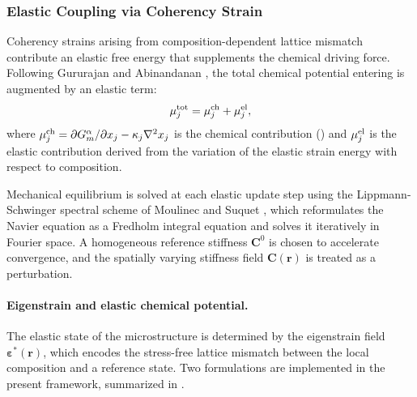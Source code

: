 \subsubsection{Elastic Coupling via Coherency Strain}
\label{sec:elastic_coupling_pf}

{\color{blue}
Coherency strains arising from composition-dependent lattice mismatch
contribute an elastic free energy that supplements the chemical driving
force.  Following Gururajan and Abinandanan \cite{gururajan2007phase},
the total chemical potential entering  is
augmented by an elastic term:
%
\begin{equation}\label{eq:mu_tot_elastic}
    \mu_j^{\rm tot} = \mu_j^{\rm ch} + \mu_j^{\rm el},
\end{equation}
%
where $\mu_j^{\rm ch} = \partial G^\alpha_m/\partial x_j - \kappa_j\nabla^2 x_j$
is the chemical contribution () and $\mu_j^{\rm el}$
is the elastic contribution derived from the variation of the elastic
strain energy with respect to composition.

Mechanical equilibrium is solved at each elastic update step using the
Lippmann-Schwinger spectral scheme of Moulinec and
Suquet \cite{moulinec1998numerical}, which reformulates the Navier
equation as a Fredholm integral equation and solves it iteratively in
Fourier space.  A homogeneous reference stiffness $\mathbf{C}^0$ is
chosen to accelerate convergence, and the spatially varying stiffness
field $\mathbf{C}(\boldsymbol{r})$ is treated as a perturbation.

\paragraph{Eigenstrain and elastic chemical potential.}

The elastic state of the microstructure is determined by the
eigenstrain field $\boldsymbol{\varepsilon}^*(\boldsymbol{r})$, which encodes the
stress-free lattice mismatch between the local composition and a
reference state.  Two formulations are implemented in the present
framework, summarized in .

}
